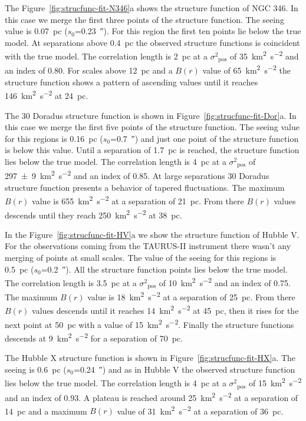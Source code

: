 \documentclass[fleqn,usenatbib, useAMS, a4paper]{mnras}
\newcommand\pos{\ensuremath{_{\mathrm{pos}}}}
\begin{document}
The Figure~\ref{fig:strucfunc-fit-N346}a shows the structure function of NGC 346.
In this case we merge the first three points of the structure function.
The seeing value is \SI{0.07}{pc} (\(s_0\)=\SI{0.23}{\arcsecond}).
For this region the first ten points lie below the true model.
At separations above \SI{0.4}{pc} the observed structure functions is coincident with the true model. 
The correlation length is \SI{2}{pc} at a \(\sigma^2\pos\) of \SI{35}{km^{2}.s^{-2}} and an index of \num{0.80}.
For scales above \SI{12}{pc} and a \(B(r)\) value of \SI{65}{km^{2}.s^{-2}} the structure function shows a pattern of ascending values until it reaches \SI{146}{km^{2}.s^{-2}} at \SI{24}{pc}.  

The 30 Doradus structure function is shown in Figure~\ref{fig:strucfunc-fit-Dor}a.
In this case we merge the first five points of the structure function.
The seeing value for this regions is \SI{0.16}{pc} (\(s_0\)=\SI{0.7}{\arcsecond}) and just one point of the structure function is below this value.
Until a separation of \SI{1.7}{pc} is reached, the structure function lies below the true model.
The correlation length is \SI{4}{pc} at a \(\sigma^2\pos\) of \SI{297 \pm 9}{km^{2}.s^{-2}} and an index of \num{0.85}.
At large separations 30 Doradus structure function presents a behavior of tapered fluctuations.  
The maximum \(B(r)\) value is \SI{655}{km^{2}.s^{-2}} at a separation of \SI{21}{pc}. 
From there \(B(r)\) values descends until they reach \SI{250}{km^{2}.s^{-2}} at \SI{38}{pc}.

In the Figure~\ref{fig:strucfunc-fit-HV}a we show the structure function of Hubble V.
For the observations coming from the TAURUS-II instrument there wasn't any merging of points at small scales.
The value of the seeing for this regions is \SI{0.5}{pc} (\(s_0\)=\SI{0.2}{\arcsecond}).
All the structure function points lies below the true model.
The correlation length is \SI{3.5}{pc} at a \(\sigma^2\pos\) of  \SI{10}{km^{2}.s^{-2}} and an index of \num{0.75}.
The maximum \(B(r)\) value is \SI{18}{km^{2}.s^{-2}} at a separation of \SI{25}{pc}. 
From there \(B(r)\) values descends until it reaches \SI{14}{km^{2}.s^{-2}} at \SI{45}{pc}, then it rises for the next point at \SI{50}{pc} with a value of \SI{15}{km^{2}.s^{-2}}.
Finally the structure functions descends at \SI{9}{km^{2}.s^{-2}} for a separation of \SI{70}{pc}.

The Hubble X structure function is shown in Figure~\ref{fig:strucfunc-fit-HX}a.
The seeing is \SI{0.6}{pc} (\(s_0\)=\SI{0.24}{\arcsecond}) and as in Hubble V the observed structure function lies below the true model.
The correlation length is \SI{4}{pc} at a \(\sigma^2\pos\) of \SI{15}{km^{2}.s^{-2}} and an index of \num{0.93}.
A plateau is reached around \SI{25}{km^{2}.s^{-2}} at a separation of \SI{14}{pc} and a maximum \(B(r)\) value of \SI{31}{km^{2}.s^{-2}} at a separation of \SI{36}{pc}.
\end{document}
